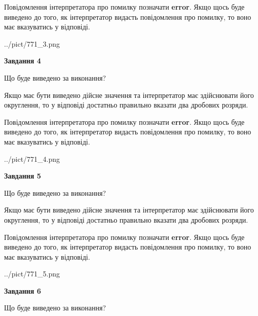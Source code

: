 \documentclass[12pt, ukrainian]{article}
\begin{document}
{\begin {Large}
Повідомлення інтерпретатора про помилку позначати \textbf{error}.
Якщо щось буде виведено до того, як інтерпретатор видасть повідомлення про помилку, 
то воно має вказуватись у відповіді. \par

\begin{center}
	{../pict/771_3.png}
\end{center}
\newpage

{\begin {center}\textbf{Завдання 4}\end {center}}\par
Що буде виведено за виконання? \par

Якщо має бути виведено дійсне значення та інтерпретатор має здійснювати його округлення, 
то у відповіді достатньо правильно вказати два дробових розряди.

Повідомлення інтерпретатора про помилку позначати \textbf{error}.
Якщо щось буде виведено до того, як інтерпретатор видасть повідомлення про помилку, 
то воно має вказуватись у відповіді. \par

\begin{center}
	{../pict/771_4.png}
\end{center}
\newpage

{\begin {center}\textbf{Завдання 5}\end {center}}\par
Що буде виведено за виконання? \par

Якщо має бути виведено дійсне значення та інтерпретатор має здійснювати його округлення, 
то у відповіді достатньо правильно вказати два дробових розряди.

Повідомлення інтерпретатора про помилку позначати \textbf{error}.
Якщо щось буде виведено до того, як інтерпретатор видасть повідомлення про помилку, 
то воно має вказуватись у відповіді. \par

\begin{center}
	{../pict/771_5.png}
\end{center}
\newpage

{\begin {center}\textbf{Завдання 6}\end {center}}\par
Що буде виведено за виконання? \par


\end{Large}}
\end{document}
